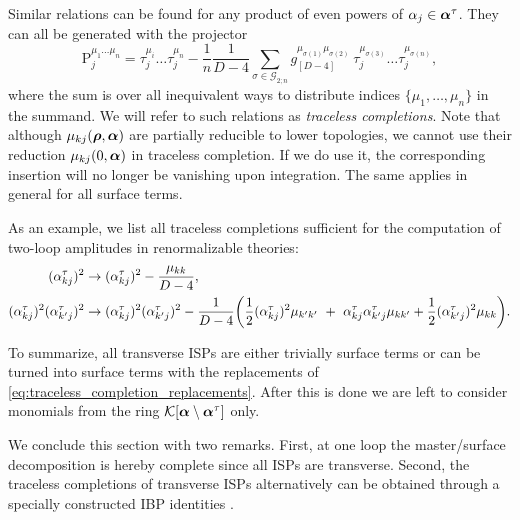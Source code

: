 Similar relations can be found for any product of even powers of $\alpha_j \in \vb*{\alpha}^\tau$.
They can all be generated with the projector
\begin{equation}
  \mathrm{P}^{\mu_1\ldots{}\mu_n}_j =  \tau^{\mu_i}_j\ldots{}\tau^{\mu_n}_j - \frac{1}{n}\frac{1}{D-4} \sum_{\sigma \in \mathcal{G}_{2;n}}^{} g^{\mu_{\sigma(1)}\mu_{\sigma(2)}}_{[D-4]}~\tau^{\mu_{\sigma(3)}}_j\ldots{}\tau^{\mu_{\sigma(n)}}_j,
\end{equation}
where the sum is over all inequivalent ways to distribute indices $\{\mu_1,\ldots{},\mu_n\}$ in the summand.
We will refer to such relations as \emph{traceless completions}.
Note that although $\mu_{kj}(\vb*{\rho},\vb*{\alpha})$ are partially reducible to lower topologies,
we cannot use their reduction $\mu_{kj}(0,\vb*{\alpha})$ in traceless completion. If we do use it, the
corresponding insertion will no longer be vanishing upon integration.
The same applies in general for all surface terms.

As an example, we list all traceless completions sufficient for the computation of two-loop amplitudes in renormalizable theories:
\begin{align} \label{eq:traceless_completion_replacements}
  (\alpha_{kj}^{\tau})^2 &\to (\alpha_{kj}^{\tau})^2 - \frac{\mu_{kk}}{D-4}, \\
  \nonumber
  (\alpha_{kj}^{\tau})^2(\alpha_{k^\prime j}^{\tau})^2 &\to
  (\alpha_{kj}^{\tau})^2(\alpha_{k^\prime j}^{\tau})^2 - \frac{1}{D-4} \qty(
    \frac{1}{2}(\alpha_{kj}^{\tau})^2 \mu_{k^\prime k^\prime} ~+~ \alpha_{kj}^{\tau}\alpha_{k^\prime j}^{\tau} \mu_{k k^\prime} + \frac{1}{2}(\alpha_{k^\prime j}^{\tau})^2 \mu_{k k}
  ).
\end{align}

To summarize, all transverse ISPs are either trivially surface terms or can be turned into surface terms with the replacements of \cref{eq:traceless_completion_replacements}.
After this is done we are left to consider monomials from the ring $\mathcal{K}[\vb*{\alpha}\setminus\vb*{\alpha}^\tau]$ only.


We conclude this section with two remarks.
First, at one loop the master/surface decomposition is hereby complete since all ISPs are transverse.
Second, the traceless completions of transverse ISPs alternatively
can be obtained through a specially constructed IBP identities \cite{Ita:2015tya}.




